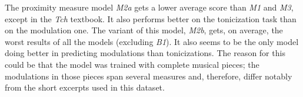 
The proximity measure model \emph{M2a} gets a lower average
score than \emph{M1} and \emph{M3}, except in the \emph{Tch}
textbook. It also performs better on the tonicization task
than on the modulation one. The variant of this model,
\emph{M2b}, gets, on average, the worst results of all the
models (excluding \emph{B1}). It also seems to be the only
model doing better in predicting modulations than
tonicizations.
The reason for this could be that the model was trained with
complete musical pieces; the modulations in those pieces
span several measures and, therefore, differ notably from
the short excerpts used in this dataset.

